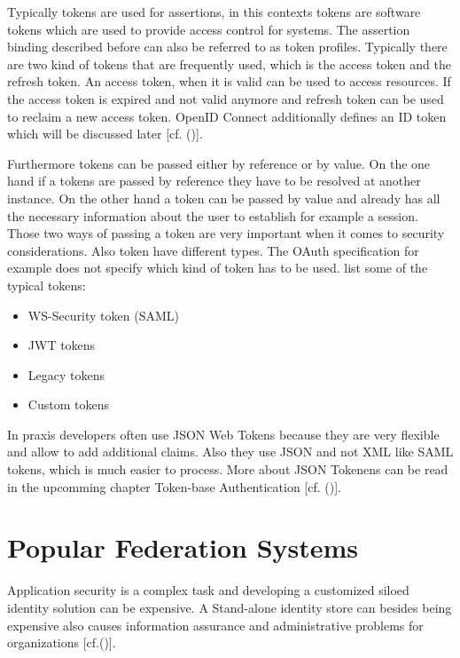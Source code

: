 Typically tokens are used for assertions, in this contexts tokens are software tokens which are used to provide access control for systems. The assertion binding described before can also be referred to as token profiles. Typically there are two kind of tokens that are frequently used, which is the access token and the refresh token. An access token, when it is valid can be used to access resources. If the access token is expired and not valid anymore and refresh token can be used to reclaim a new access token. OpenID Connect additionally defines an ID token which will be discussed later [cf. (\cite{Spencer:2018:APISecurity})]. 

Furthermore tokens can be passed either by reference or by value. On the one hand if a tokens are passed by reference they have to be resolved at another instance. On the other hand a token can be passed by value and already has all the necessary information about the user to establish for example a session. Those two ways of passing a token are very important when it comes to security considerations. Also token have different types. The OAuth specification for example does not specify which kind of token has to be used. \cite{Spencer:2018:APISecurity} list some of the typical tokens: 

\begin{itemize}
	\item WS-Security token (SAML)
	\item JWT tokens
	\item Legacy tokens
	\item Custom tokens
\end{itemize}

In praxis developers often use JSON Web Tokens because they are very flexible and allow to add additional claims. Also they use JSON and not XML like SAML tokens, which is much easier to process. More about JSON Tokenens can be read in the upcomming chapter Token-base Authentication [cf. (\cite{Spencer:2018:APISecurity})].



\section{Popular Federation Systems}

Application security is a complex task and developing a customized siloed identity solution can be expensive. A Stand-alone identity store can besides being expensive also causes information assurance and administrative problems for organizations  [cf.(\cite{JerichoSystems:IS})]. 

